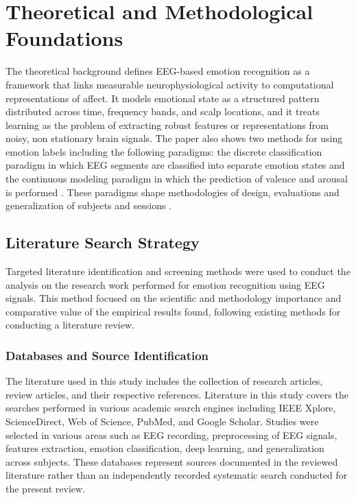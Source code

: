 \documentclass[ASNA,twocolumn]{USG}
\begin{document}
\section{Theoretical and Methodological Foundations}
The theoretical background defines EEG-based emotion recognition as a framework that links measurable neurophysiological activity to computational representations of affect. It models emotional state as a structured pattern distributed across time, frequency bands, and scalp locations, and it treats learning as the problem of extracting robust features or representations from noisy, non stationary brain signals. The paper also shows two methods for using emotion labels including the following paradigms: the discrete classification paradigm in which EEG segments are classified into separate emotion states and the continuous modeling paradigm in which the prediction of valence and arousal is performed \cite{ma2024comprehensive}. These paradigms shape methodologies of design, evaluations and generalization of subjects and sessions \cite{li2021can}.


\subsection{Literature Search Strategy}
\label{subsec:literature_search_strategy}
Targeted literature identification and screening methods were used to conduct the analysis on the research work performed for emotion recognition using EEG signals. This method focused on the scientific and methodology importance and comparative value of the empirical results found, following existing methods for conducting a literature review.

\subsubsection{Databases and Source Identification}
The literature used in this study includes the collection of research articles, review articles, and their respective references. Literature in this study covers the searches performed in various academic search engines including IEEE Xplore, ScienceDirect, Web of Science, PubMed, and Google Scholar. Studies were selected in various areas such as EEG recording, preprocessing of EEG signals, features extraction, emotion classification, deep learning, and generalization across subjects. These databases represent sources documented in the reviewed literature rather than an independently recorded systematic search conducted for the present review.
\end{document}
